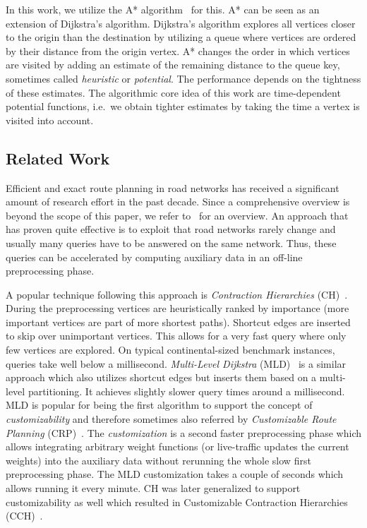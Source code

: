 \documentclass[a4paper,UKenglish,cleveref, autoref, thm-restate]{lipics-v2021}
\begin{document}
In this work, we utilize the A* algorithm~\cite{hnr-afbhd-68} for this.
A* can be seen as an extension of Dijkstra's algorithm.
Dijkstra's algorithm explores all vertices closer to the origin than the destination by utilizing a queue where vertices are ordered by their distance from the origin vertex.
A* changes the order in which vertices are visited by adding an estimate of the remaining distance to the queue key, sometimes called \emph{heuristic} or \emph{potential}.
The performance depends on the tightness of these estimates.
The algorithmic core idea of this work are time-dependent potential functions, i.e.\ we obtain tighter estimates by taking the time a vertex is visited into account.

\subsection{Related Work}

Efficient and exact route planning in road networks has received a significant amount of research effort in the past decade.
Since a comprehensive overview is beyond the scope of this paper, we refer to~\cite{bdgmpsww-rptn-16} for an overview.
An approach that has proven quite effective is to exploit that road networks rarely change and usually many queries have to be answered on the same network.
Thus, these queries can be accelerated by computing auxiliary data in an off-line preprocessing phase.

A popular technique following this approach is \emph{Contraction Hierarchies} (CH)~\cite{gssv-erlrn-12}.
During the preprocessing vertices are heuristically ranked by importance (more important vertices are part of more shortest paths).
Shortcut edges are inserted to skip over unimportant vertices.
This allows for a very fast query where only few vertices are explored.
On typical continental-sized benchmark instances, queries take well below a millisecond.
\emph{Multi-Level Dijkstra} (MLD)~\cite{swz-umlgt-02} is a similar approach which also utilizes shortcut edges but inserts them based on a multi-level partitioning.
It achieves slightly slower query times around a millisecond.
MLD is popular for being the first algorithm to support the concept of \emph{customizability} and therefore sometimes also referred by \emph{Customizable Route Planning} (CRP)~\cite{dgpw-crprn-13}.
The \emph{customization} is a second faster preprocessing phase which allows integrating arbitrary weight functions (or live-traffic updates the current weights) into the auxiliary data without rerunning the whole slow first preprocessing phase.
The MLD customization takes a couple of seconds which allows running it every minute.
CH was later generalized to support customizability as well which resulted in Customizable Contraction Hierarchies (CCH)~\cite{dsw-cch-15}.
\end{document}
